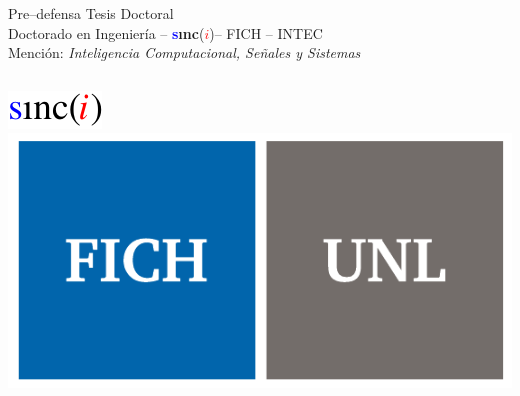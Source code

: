 \documentclass{beamer}
\title[Pre--defensa Tesis Doctoral]{\TITLE}
\author[David N. Campo - (CIDISI - \sinc - CONICET)]{ 
		Ing. David N. Campo \\[2pt]
		Director: Dra. Georgina Stegmayer \\[2pt]
		Co--Director: Dr. Diego H. Milone \\[2pt]
}
\date{}
\newcommand{\sinc}{{\bf\textcolor{blue}{s}{\i}nc}(\textcolor{red}{$i$})}
\begin{document}

\begin{frame}[plain]	
  \titlepage{}	
	\vspace{-2cm}
	\begin{center}
	\begin{rmfamily}
		\begin{normalsize}
			\tiny Pre--defensa Tesis Doctoral \\[1mm]
			\tiny Doctorado en Ingeniería -- \sinc -- FICH -- INTEC \\[0.3mm]
			\tiny Mención: \textit{Inteligencia Computacional, Señales y Sistemas}
		\end{normalsize}
	\end{rmfamily}
\end{center}
	 
	\begin{columns}
		\begin{column}{30mm}
		\vspace{-2mm}
			\begin{center}
					\includegraphics[scale = 0.75]{logos/logo_sinc.pdf}\\
					\includegraphics[scale = 0.15]{logos/fichunl_vect.pdf}
			\end{center}
		\end{column}

		\hspace*{-20mm}
		

\end{columns}
\end{frame}
\end{document}
